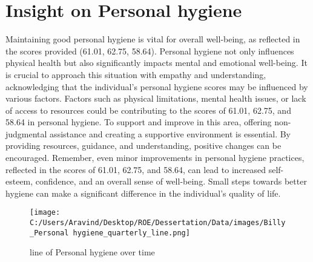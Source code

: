 \documentclass[10pt, a4paper]{article}%
\begin{document}
%
\section{Insight on Personal hygiene}%
\label{sec:InsightonPersonalhygiene}%
Maintaining good personal hygiene is vital for overall well{-}being, as reflected in the scores provided (61.01, 62.75, 58.64). Personal hygiene not only influences physical health but also significantly impacts mental and emotional well{-}being. It is crucial to approach this situation with empathy and understanding, acknowledging that the individual's personal hygiene scores may be influenced by various factors.\newline%
\newline%
Factors such as physical limitations, mental health issues, or lack of access to resources could be contributing to the scores of 61.01, 62.75, and 58.64 in personal hygiene. To support and improve in this area, offering non{-}judgmental assistance and creating a supportive environment is essential. By providing resources, guidance, and understanding, positive changes can be encouraged.\newline%
\newline%
Remember, even minor improvements in personal hygiene practices, reflected in the scores of 61.01, 62.75, and 58.64, can lead to increased self{-}esteem, confidence, and an overall sense of well{-}being. Small steps towards better hygiene can make a significant difference in the individual's quality of life.%
\begin{figure}[H]%
\centering%
\texttt{[image: C:/Users/Aravind/Desktop/ROE/Dessertation/Data/images/Billy\_Personal hygiene\_quarterly\_line.png]}%
\caption{line of Personal hygiene over time}%
\end{figure}

%
\end{document}
